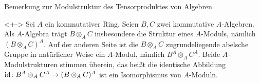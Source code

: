 \begin{frame}{Bemerkung zur Modulstruktur des Tensorproduktes von Algebren}
	\begin{remark}<+->
		Sei \(A\) ein kommutativer Ring. Seien \(B, C\) zwei kommutative \(A\)-Algebren. Als \(A\)-Algebra trägt \(B \otimes_A C\)
		insbesondere die Struktur eines \(A\)-Moduls, nämlich \((B \otimes_A C)^A\). Auf der anderen Seite ist die \(B \otimes_A C\)
		zugrundeliegende abelsche Gruppe in natürlicher Weise ein \(A\)-Modul, nämlich \(B^A \otimes_A C^A\). Beide \(A\)-Modulstrukturen
		stimmen überein, das heißt die identische Abbildung \(\operatorname{id}\colon B^A \otimes_A C^A \to (B \otimes_A C)^A\) ist ein
		Isomorphismus von \(A\)-Moduln.
	\end{remark}
\end{frame}

